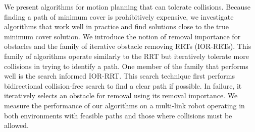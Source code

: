 %
%
%

We present algorithms for motion planning that can tolerate collisions. Because finding a path of minimum cover is prohibitively expensive, we investigate algorithms that work well in practice and find solutions close to the true minimum cover solution. We introduce the notion of removal importance for obstacles and the family of iterative obstacle removing RRTs (IOR-RRTs). This family of algorithms operate similarly to the RRT but iteratively tolerate more collisions in trying to identify a path. One member of the family that performs well is the search informed IOR-RRT. This search technique first performs bidirectional collision-free search to find a clear path if possible. In failure, it iteratively selects an obstacle for removal using its removal importance. We measure the performance of our algorithms on a multi-link robot operating in both environments with feasible paths and those where collisions must be allowed. 